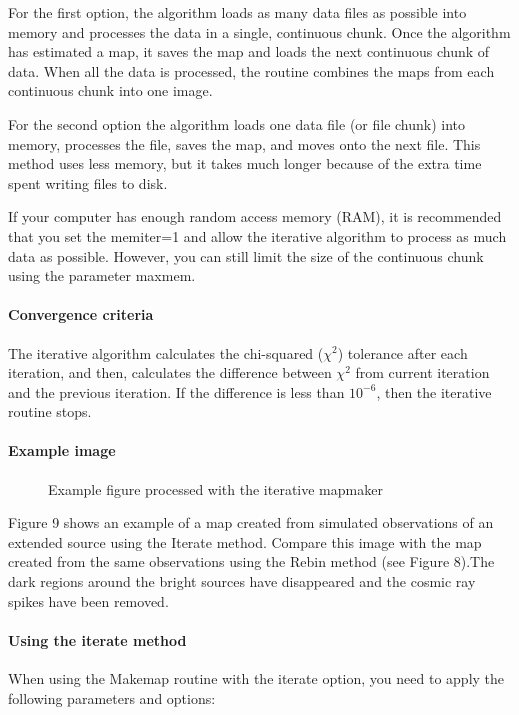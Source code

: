 \documentclass[twoside,11pt]{article}
\renewcommand{\_}{\texttt{\symbol{95}}}
\begin{document}
For the first option, the algorithm loads as many data files as
possible into memory and processes the data in a single, continuous
chunk. Once the algorithm has estimated a map, it saves the map and
loads the next continuous chunk of data. When all the data is
processed, the routine combines the maps from each continuous chunk
into one image.

For the second option the algorithm loads one data file (or file
chunk) into memory, processes the file, saves the map, and moves onto
the next file. This method uses less memory, but it takes much longer
because of the extra time spent writing files to disk.

If your computer has enough random access memory (RAM), it is
recommended that you set the memiter=1 and allow the iterative
algorithm to process as much data as possible. However, you can still
limit the size of the continuous chunk using the parameter maxmem.

\paragraph{Convergence criteria}

The iterative algorithm calculates the chi-squared ($\chi^2$)
tolerance after each iteration, and then, calculates the difference
between $\chi^2$ from current iteration and the previous iteration. If
the difference is less than $10^{-6}$, then the iterative routine
stops.

\paragraph{Example image}

\begin{figure}
\caption{Example figure processed with the iterative mapmaker}
\end{figure}

Figure 9 shows an example of a map created from simulated observations
of an extended source using the Iterate method. Compare this image
with the map created from the same observations using the Rebin method
(see Figure 8).The dark regions around the bright sources have
disappeared and the cosmic ray spikes have been removed.


\paragraph{Using the iterate method}
When using the Makemap routine with the iterate option, you need to apply
the following parameters and options:
\end{document}
